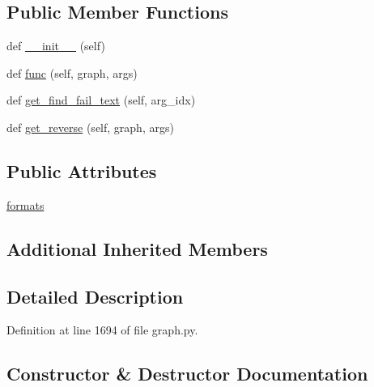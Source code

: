 \subsection*{Public Member Functions}
\begin{DoxyCompactItemize}
\item 
def \hyperlink{classlight__chats_1_1graph_1_1RemoveObjectFunction_a1ec221c7902c9aebb94137d84c1ee929}{\+\_\+\+\_\+init\+\_\+\+\_\+} (self)
\item 
def \hyperlink{classlight__chats_1_1graph_1_1RemoveObjectFunction_ae7b012e25908e96e2aaffcd567c0e133}{func} (self, graph, args)
\item 
def \hyperlink{classlight__chats_1_1graph_1_1RemoveObjectFunction_a28db384929d4d974a230d27546e23c6b}{get\+\_\+find\+\_\+fail\+\_\+text} (self, arg\+\_\+idx)
\item 
def \hyperlink{classlight__chats_1_1graph_1_1RemoveObjectFunction_a25e0182ea553e22cc861479aabd6a989}{get\+\_\+reverse} (self, graph, args)
\end{DoxyCompactItemize}
\subsection*{Public Attributes}
\begin{DoxyCompactItemize}
\item 
\hyperlink{classlight__chats_1_1graph_1_1RemoveObjectFunction_a67165948c1e8f963e79aac98baf91509}{formats}
\end{DoxyCompactItemize}
\subsection*{Additional Inherited Members}


\subsection{Detailed Description}
\begin{DoxyVerb}
\end{DoxyVerb}
 

Definition at line 1694 of file graph.\+py.



\subsection{Constructor \& Destructor Documentation}
\mbox{\label{classlight__chats_1_1graph_1_1RemoveObjectFunction_a1ec221c7902c9aebb94137d84c1ee929}} 
